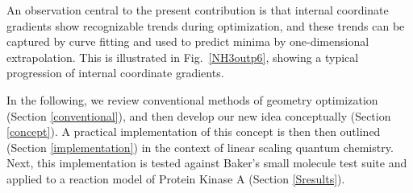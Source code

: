 \documentclass[prl,aps,preprint,showpacs,superbib]{revtex4}
\begin{document}

An observation central to the present contribution is that internal coordinate gradients show recognizable trends 
during optimization, and these trends can be captured by curve fitting and used to predict minima by 
one-dimensional extrapolation.  This is illustrated in Fig.~\ref{NH3outp6}, showing a typical progression of 
internal coordinate gradients.  

In the following, we review conventional methods of geometry optimization (Section \ref{conventional}), 
and then  develop our new idea conceptually (Section \ref{concept}).  A practical implementation of this 
concept is then then outlined (Section \ref{implementation}) in the context of linear scaling quantum 
chemistry.  Next, this implementation is tested against Baker's small molecule test suite and applied to 
a reaction model of Protein Kinase A (Section \ref{Sresults}).  
\end{document}
